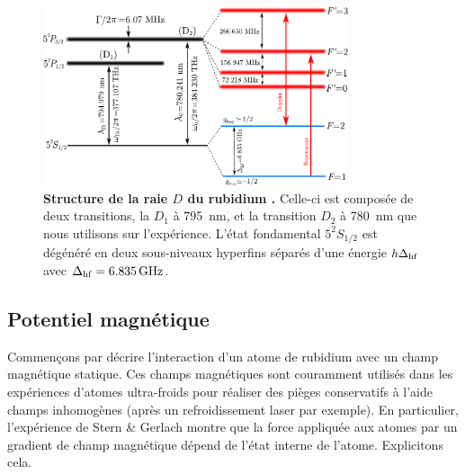 \begin{figure}
\centering
\includegraphics[width=0.8\textwidth]{Fig/BEC_manip/Rb87.pdf}
\caption{\textbf{Structure de la raie $D$ du rubidium .} Celle-ci est composée de deux transitions, la $D_1$ à \SI{795}{\nano\metre}, et la transition $D_2$ à \SI{780}{\nano\metre} que nous utilisons sur l'expérience. L'état fondamental $5^2S_{1/2}$ est dégénéré en deux sous-niveaux hyperfins séparés d'une énergie $h \Delta_{\mathrm{hf}}$ avec $\Delta_{\mathrm{hf}}=\SI{6.835}{\giga\hertz}$.}
\label{fig:Rb87}
\end{figure}

\subsection{Potentiel magnétique}
Commençons par décrire l'interaction d'un atome de rubidium avec un champ magnétique statique. Ces champs magnétiques sont couramment utilisés dans les expériences d'atomes ultra-froids pour réaliser des pièges conservatifs à l'aide champs inhomogènes (après un refroidissement laser par exemple). En particulier, l'expérience de Stern \& Gerlach montre que la force appliquée aux atomes par un gradient de champ magnétique dépend de l'état interne de l'atome. Explicitons cela.

